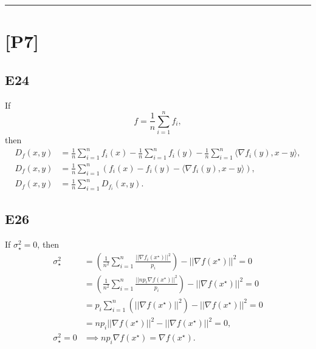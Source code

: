 \documentclass[12pt]{article}
\begin{document}
\hrule
\vspace{0.1cm}
\section*{[P7]}
\subsection*{E24}
If
\begin{equation*}
    f = \frac{1}{n} \sum^n_{i=1}f_i,
\end{equation*}
then
\begin{equation*}
    \begin{split}
        D_f(x, y) &= \frac{1}{n} \sum^n_{i=1} f_i(x) - 
                \frac{1}{n} \sum^n_{i=1} f_i(y) - 
                \frac{1}{n} \sum^n_{i=1} \langle \nabla f_i(y), x-y \rangle, \\
        D_f(x, y) &= \frac{1}{n} \sum^n_{i=1} (f_i(x) - f_i(y) - \langle \nabla f_i(y), x-y \rangle), \\
        D_f(x, y) &= \frac{1}{n} \sum^n_{i=1} D_{f_i}(x, y).
    \end{split}
\end{equation*}
\subsection*{E26}
If $\sigma^2_\star = 0$, then
\begin{equation*}
    \begin{split}
        \sigma^2_\star &= \left(\frac{1}{n^2} \sum_{i=1}^n \frac{||\nabla f_i(x^\star)||^2}{p_i}\right) - ||\nabla f(x^\star)||^2 = 0 \\
        &= \left(\frac{1}{n^2} \sum_{i=1}^n \frac{||np_i \nabla f(x^\star)||^2}{p_i}\right) - ||\nabla f(x^\star)||^2 = 0\\
        &= p_i \sum_{i=1}^n (|| \nabla f(x^\star) ||^2) - ||\nabla f(x^\star)||^2 = 0\\
        &= np_i || \nabla f(x^\star) ||^2 - ||\nabla f(x^\star)||^2 = 0, \\
        \sigma^2_\star = 0 &\implies np_i \nabla f(x^\star) = \nabla f(x^\star).
    \end{split}
\end{equation*}
\vspace{0.1cm}
\end{document}
